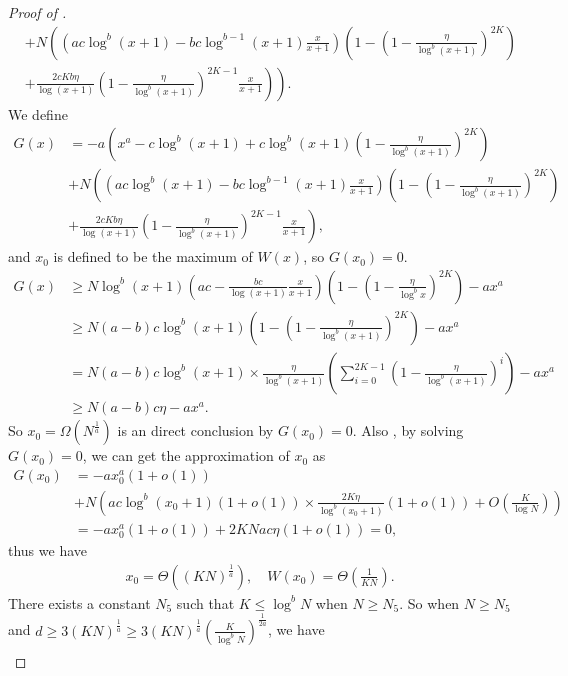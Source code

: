 \begin{proof}[Proof of ]
\begin{align*}
    &\left.+N\left(\left(ac\log^b (x+1)-bc\log^{b-1}(x+1)\frac{x}{x+1}\right)\left(1-\left(1-\frac{\eta}{\log^b (x+1)}\right)^{2K}\right)\right.\right. \\
    &\left.\left.+\frac{2cKb\eta}{\log (x+1)}\left(1-\frac{\eta}{\log^b (x+1)}\right)^{2K-1}\frac{x}{x+1}\right)\right).
\end{align*}
We define 
\begin{align*}
    G(x)&=-a\left(x^a-c\log^b (x+1)+c\log^b (x+1)\left(1-\frac{\eta}{\log^b (x+1)}\right)^{2K}\right) \\
    &+N\left(\left(ac\log^b (x+1)-bc\log^{b-1}(x+1)\frac{x}{x+1}\right)\left(1-\left(1-\frac{\eta}{\log^b (x+1)}\right)^{2K}\right)\right. \\
    &\left.+\frac{2cKb\eta}{\log (x+1)}\left(1-\frac{\eta}{\log^b (x+1)}\right)^{2K-1}\frac{x}{x+1}\right),
\end{align*}
and $x_0$ is defined to be the maximum of $W(x)$, so $G(x_0) = 0$.
\begin{align*}
    G(x)&\geq N\log^b (x+1)\left(ac-\frac{bc}{\log (x+1)}\frac{x}{x+1}\right)\left(1-\left(1-\frac{\eta}{\log^b x}\right)^{2K}\right)-ax^a\\
    &\geq N(a-b)c\log^b (x+1)\left(1-\left(1-\frac{\eta}{\log^b (x+1)}\right)^{2K}\right)-ax^a \\
    &= N(a-b)c\log^b (x+1)\times\frac{\eta}{\log^b (x+1)}\left(\sum_{i=0}^{2K-1}\left(1-\frac{\eta}{\log^b (x+1)}\right)^i\right)-ax^a\\
    &\geq N(a-b)c\eta-ax^a. 
\end{align*}
So $x_0 = \Omega\left(N^{\frac{1}{a}}\right)$ is an direct conclusion by $G(x_0) = 0$. Also , by solving $G(x_0)=0$, we can get the approximation of $x_0$ as 
\begin{align*}
    G(x_0) &= -ax_0^a(1+o(1)) \\
    &+N\left(ac\log^b (x_0+1)(1+o(1))\times\frac{2K\eta}{\log^b (x_0+1)}(1+o(1))
    +O\left(\frac{K}{\log N}\right)\right) \\
    &=-ax_0^a(1+o(1))+2KNac\eta(1+o(1))=0,
\end{align*}
thus we have
\begin{align*}
    x_0 = \Theta\left((KN)^{\frac{1}{a}}\right), \quad W(x_0)=\Theta\left(\frac{1}{KN}\right).
\end{align*}
There exists a constant $N_5$ such that $K\leq\log^b N$ when $N\geq N_5$. So when $N\geq N_5$ and $d\geq 3(KN)^{\frac{1}{a}}\geq 3(KN)^{\frac{1}{a}}\left(\frac{K}{\log^bN}\right)^{\frac{1}{2a}}$, we have
\begin{align*}

\end{align*}
\end{proof}

